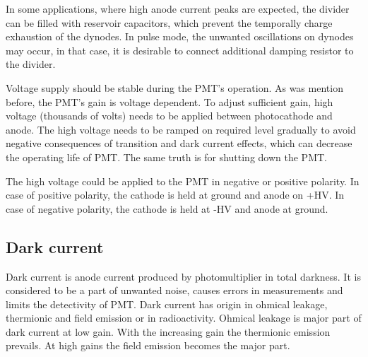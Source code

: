 \par
In some applications, where high anode current peaks are expected, the divider can be filled with reservoir capacitors, which prevent the temporally charge exhaustion of the dynodes. In pulse mode, the unwanted oscillations on dynodes may occur, in that case, it is desirable to connect additional damping resistor to the divider.
\par
Voltage supply should be stable during the PMT's operation. As was mention before, the PMT's gain is voltage dependent. To adjust sufficient gain, high voltage (thousands of volts) needs to be applied between photocathode and anode. The high voltage needs to be ramped on required level gradually to avoid negative consequences of transition and dark current effects, which can decrease the operating life of PMT. The same truth is for shutting down the PMT.
\par
The high voltage could be applied to the PMT in negative or positive polarity. In case of positive polarity, the cathode is held at ground and anode on +HV. In case of negative polarity, the cathode is held at -HV and anode at ground. 

\subsection{Dark current}
Dark current is anode current produced by photomultiplier in total darkness. It is considered to be a part of unwanted noise, causes errors in measurements and limits the detectivity of PMT. Dark current has origin in ohmical leakage, thermionic and field emission or in radioactivity. Ohmical leakage is major part of dark current at low gain. With the increasing gain the thermionic emission prevails. At high gains the field emission becomes the major part.

